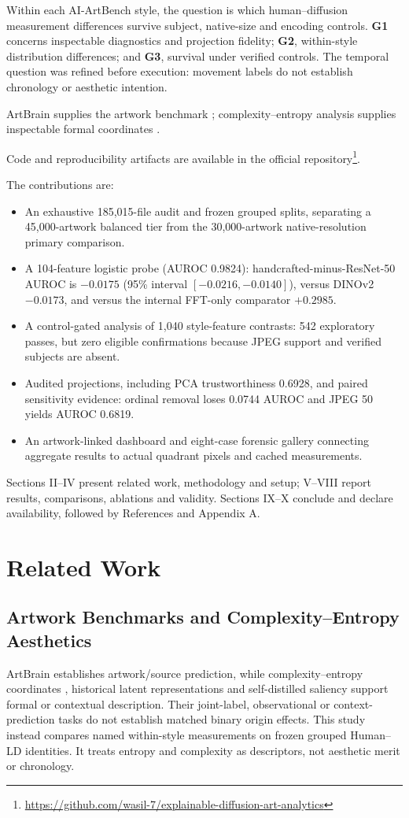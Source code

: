 \documentclass[journal,twoside,web]{IEEEtran}
\begin{document}
Within each AI-ArtBench style, the question is which human--diffusion measurement differences survive subject, native-size and encoding controls. \textbf{G1} concerns inspectable diagnostics and projection fidelity; \textbf{G2}, within-style distribution differences; and \textbf{G3}, survival under verified controls. The temporal question was refined before execution: movement labels do not establish chronology or aesthetic intention.

ArtBrain supplies the artwork benchmark \cite{p1}; complexity--entropy analysis supplies inspectable formal coordinates \cite{p2}.

Code and reproducibility artifacts are available in the official repository\footnote{\url{https://github.com/wasil-7/explainable-diffusion-art-analytics}}.

The contributions are:
\begin{itemize}
\item An exhaustive 185,015-file audit and frozen grouped splits, separating a 45,000-artwork balanced tier from the 30,000-artwork native-resolution primary comparison.
\item A 104-feature logistic probe (AUROC 0.9824): handcrafted-minus-ResNet-50 AUROC is $-0.0175$ (95\% interval $[-0.0216,-0.0140]$), versus DINOv2 $-0.0173$, and versus the internal FFT-only comparator $+0.2985$.
\item A control-gated analysis of 1,040 style-feature contrasts: 542 exploratory passes, but zero eligible confirmations because JPEG support and verified subjects are absent.
\item Audited projections, including PCA trustworthiness 0.6928, and paired sensitivity evidence: ordinal removal loses 0.0744 AUROC and JPEG 50 yields AUROC 0.6819.
\item An artwork-linked dashboard and eight-case forensic gallery connecting aggregate results to actual quadrant pixels and cached measurements.
\end{itemize}
Sections II--IV present related work, methodology and setup; V--VIII report results, comparisons, ablations and validity. Sections IX--X conclude and declare availability, followed by References and Appendix A.

\section{Related Work}
\subsection{Artwork Benchmarks and Complexity--Entropy Aesthetics}
ArtBrain \cite{p1} establishes artwork/source prediction, while complexity--entropy coordinates \cite{p2}, historical latent representations \cite{p11} and self-distilled saliency \cite{p16} support formal or contextual description. Their joint-label, observational or context-prediction tasks do not establish matched binary origin effects. This study instead compares named within-style measurements on frozen grouped Human--LD identities. It treats entropy and complexity as descriptors, not aesthetic merit or chronology.
\end{document}
